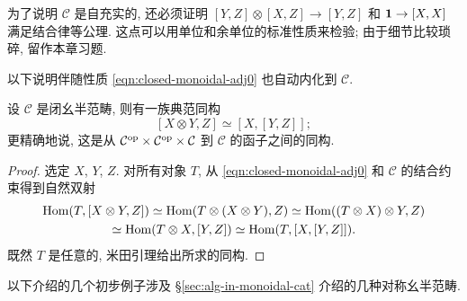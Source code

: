 为了说明 $\mathcal{C}$ 是自充实的, 还必须证明 $[Y, Z] \otimes [X, Z] \to [Y, Z]$ 和 $\bm{1} \to [X, X]$ 满足结合律等公理. 这点可以用单位和余单位的标准性质来检验; 由于细节比较琐碎, 留作本章习题.

以下说明伴随性质 \eqref{eqn:closed-monoidal-adj0} 也自动内化到 $\mathcal{C}$.

\begin{proposition}\label{prop:closed-monoidal-adj}
	设 $\mathcal{C}$ 是闭幺半范畴, 则有一族典范同构
	\[ [X \otimes Y, Z] \simeq [X, [Y, Z]]; \]
	更精确地说, 这是从 $\mathcal{C}^{\operatorname{op}} \times \mathcal{C}^{\operatorname{op}} \times \mathcal{C}$ 到 $\mathcal{C}$ 的函子之间的同构.
\end{proposition}
\begin{proof}
	选定 $X$, $Y$, $Z$. 对所有对象 $T$, 从 \eqref{eqn:closed-monoidal-adj0} 和 $\mathcal{C}$ 的结合约束得到自然双射
	\begin{multline*}
		\operatorname{Hom}(T, [X \otimes Y, Z]) \simeq \operatorname{Hom}(T \otimes (X \otimes Y), Z) \simeq \operatorname{Hom}((T \otimes X) \otimes Y, Z) \\
		\simeq \operatorname{Hom}(T \otimes X, [Y, Z]) \simeq \operatorname{Hom}(T, [X, [Y, Z]]).
	\end{multline*}
	既然 $T$ 是任意的, 米田引理给出所求的同构.
\end{proof}

以下介绍的几个初步例子涉及 \S\ref{sec:alg-in-monoidal-cat} 介绍的几种对称幺半范畴.

